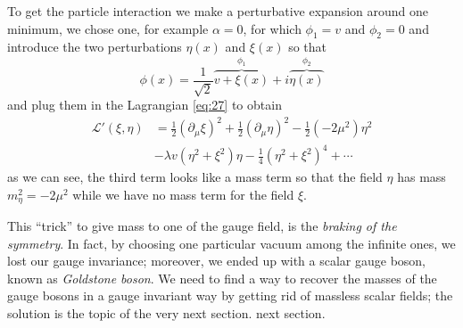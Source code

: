 To get the particle interaction we make a perturbative expansion around one
minimum, we chose one, for example $\alpha = 0$, for which $\phi_{1} = v$ and
$\phi_{2} = 0$ and introduce the two perturbations $\eta(x)$ and $\xi(x)$ so
that
\begin{equation}
  \label{eq:30}
  \phi (x) = \frac{1}{\sqrt{2}} \overbrace{v + \xi(x)}^{\phi_{1}} + i
  \overbrace{\eta(x)}^{\phi_{2}}
\end{equation}
and plug them in the Lagrangian \eqref{eq:27} to obtain
\begin{equation}
  \label{eq:31}
  \begin{split}
    \mathcal{L}' (\xi,\eta) &= \frac{1}{2}(\partial_{\mu} \xi)^{2} + \frac{1}{2}
    (\partial_{\mu} \eta)^{2} - \frac{1}{2}(-2 \mu^{2})\eta^{2} \\ &- \lambda v
    (\eta^{2} + \xi^{2}) \eta - \frac{1}{4}(\eta^{2} + \xi^{2})^{4} + \cdots
  \end{split}
\end{equation}
as we can see, the third term looks like a mass term so that the field $\eta$
has mass $m_{\eta}^{2} = -2 \mu^{2}$ while we have no mass term for the field
$\xi$.

This ``trick'' to give mass to one of the gauge field, is the \emph{braking of
  the symmetry}. In fact, by choosing one particular vacuum among the infinite
ones, we lost our gauge invariance; moreover, we ended up with a scalar gauge
boson, known as \emph{Goldstone boson}. We need to find a way to recover the
masses of the gauge bosons in a gauge invariant way by getting rid of massless
scalar fields; the solution is the topic of the very next section.  next
section.

